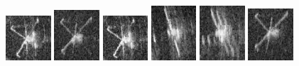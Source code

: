 \begin{figure}
    \includegraphics[width=0.15\textwidth]{chapters/images/dataset/all-class-images/valve/valve-52.jpg}
    \includegraphics[width=0.15\textwidth]{chapters/images/dataset/all-class-images/valve/valve-119.jpg}
    \includegraphics[width=0.15\textwidth]{chapters/images/dataset/all-class-images/valve/valve-48.jpg}
    \includegraphics[width=0.15\textwidth]{chapters/images/dataset/all-class-images/valve/valve-32.jpg}
    \includegraphics[width=0.15\textwidth]{chapters/images/dataset/all-class-images/valve/valve-25.jpg}
    \includegraphics[width=0.15\textwidth]{chapters/images/dataset/all-class-images/valve/valve-126.jpg}
    

\end{figure}
